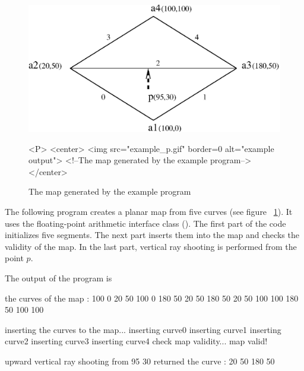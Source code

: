 \begin{figure}[h]
\begin{ccTexOnly}
    \centerline{
      \includegraphics{example_p.ps}
    }
\end{ccTexOnly}

\caption{The map generated by the example program
\label{PM_sec:example_pic}}

\begin{ccHtmlOnly}
    <P>
    <center>
        <img src="example_p.gif"  border=0 alt="example output">
        <!--The map generated by the example program-->
    </center>
\end{ccHtmlOnly}
\end{figure}

The following program creates a planar map from five curves (see
figure ~\ref{PM_sec:example_pic}). It uses the floating-point
arithmetic interface class
(). The first part of the
code initializes five segments. The next part inserts them into the map
and checks the validity of the map. In the last part, vertical ray
shooting is performed from the point $p$.


The output of the program is

\begin{ccExampleCode}
the curves of the map :
100 0 20 50
100 0 180 50
20 50 180 50
20 50 100 100
180 50 100 100

inserting the curves to the map...
inserting curve0
inserting curve1
inserting curve2
inserting curve3
inserting curve4
check map validity... map valid!

upward vertical ray shooting from 95 30
returned the curve : 20 50 180 50

\end{ccExampleCode}

